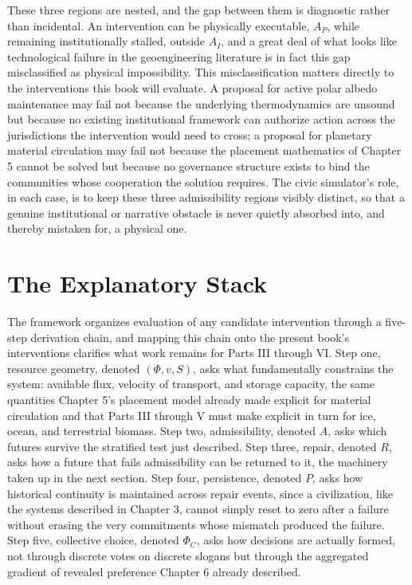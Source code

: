 \documentclass[11pt,oneside]{book}
\begin{document}
These three regions are nested, and the gap between them is diagnostic rather than incidental. An intervention can be physically executable, $A_P$, while remaining institutionally stalled, outside $A_I$, and a great deal of what looks like technological failure in the geoengineering literature is in fact this gap misclassified as physical impossibility. This misclassification matters directly to the interventions this book will evaluate. A proposal for active polar albedo maintenance may fail not because the underlying thermodynamics are unsound but because no existing institutional framework can authorize action across the jurisdictions the intervention would need to cross; a proposal for planetary material circulation may fail not because the placement mathematics of Chapter 5 cannot be solved but because no governance structure exists to bind the communities whose cooperation the solution requires. The civic simulator's role, in each case, is to keep these three admissibility regions visibly distinct, so that a genuine institutional or narrative obstacle is never quietly absorbed into, and thereby mistaken for, a physical one.

\section*{The Explanatory Stack}

The framework organizes evaluation of any candidate intervention through a five-step derivation chain, and mapping this chain onto the present book's interventions clarifies what work remains for Parts III through VI. Step one, resource geometry, denoted $(\Phi, v, S)$, asks what fundamentally constrains the system: available flux, velocity of transport, and storage capacity, the same quantities Chapter 5's placement model already made explicit for material circulation and that Parts III through V must make explicit in turn for ice, ocean, and terrestrial biomass. Step two, admissibility, denoted $A$, asks which futures survive the stratified test just described. Step three, repair, denoted $R$, asks how a future that fails admissibility can be returned to it, the machinery taken up in the next section. Step four, persistence, denoted $P$, asks how historical continuity is maintained across repair events, since a civilization, like the systems described in Chapter 3, cannot simply reset to zero after a failure without erasing the very commitments whose mismatch produced the failure. Step five, collective choice, denoted $\Phi_C$, asks how decisions are actually formed, not through discrete votes on discrete slogans but through the aggregated gradient of revealed preference Chapter 6 already described.
\end{document}
